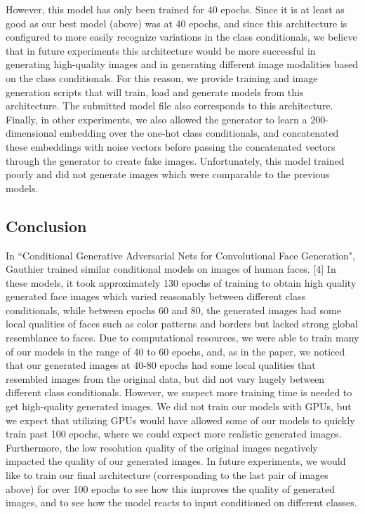 \documentclass[a4paper]{article}
\begin{document}
However, this model has only been trained for 40 epochs. Since it is at least as good as our best model (above) was at 40 epochs, and since this architecture is configured to more easily recognize variations in the class conditionals, we believe that in future experiments this architecture would be more successful in generating high-quality images and in generating different image modalities based on the class conditionals. For this reason, we provide training and image generation scripts that will train, load and generate models from this architecture. The submitted model file also corresponds to this architecture. 
\newline
\newline
Finally, in other experiments, we also allowed the generator to learn a 200-dimensional embedding over the one-hot class conditionals, and concatenated these embeddings with noise vectors before passing the concatenated vectors through the generator to create fake images. Unfortunately, this model trained poorly and did not generate images which were comparable to the previous models. 
\subsection*{Conclusion}
In ``Conditional Generative Adversarial Nets for Convolutional Face Generation", Gauthier trained similar conditional models on images of human faces. [4] In these models, it took approximately 130 epochs of training to obtain high quality generated face images which varied reasonably between different class conditionals, while between epochs 60 and 80, the generated images had some local qualities of faces such as color patterns and borders but lacked strong global resemblance to faces. Due to computational resources, we were able to train many of our models in the range of 40 to 60 epochs, and, as in the paper, we noticed that our generated images at 40-80 epochs had some local qualities that resembled images from the original data, but did not vary hugely between different class conditionals.
\newline
\newline
However, we suspect more training time is needed to get high-quality generated images. We did not train our models with GPUs, but we expect that utilizing GPUs would have allowed some of our models to quickly train past 100 epochs, where we could expect more realistic generated images. Furthermore, the low resolution quality of the original images negatively impacted the quality of our generated images. In future experiments, we would like to train our final architecture (corresponding to the last pair of images above) for over 100 epochs to see how this improves the quality of generated images, and to see how the model reacts to input conditioned on different classes.
\end{document}
